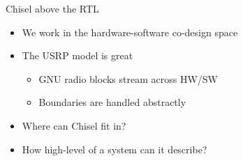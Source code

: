 \documentclass{beamer}
\begin{document}
\begin{frame}{Chisel above the RTL}
  \begin{itemize}
  \item We work in the hardware-software co-design space
  \item The USRP model is great
    \begin{itemize}
    \item GNU radio blocks stream across HW/SW
    \item Boundaries are handled abstractly
    \end{itemize}
  \item Where can Chisel fit in?
  \item How high-level of a system can it describe?
  \end{itemize}
\end{frame}
\end{document}
